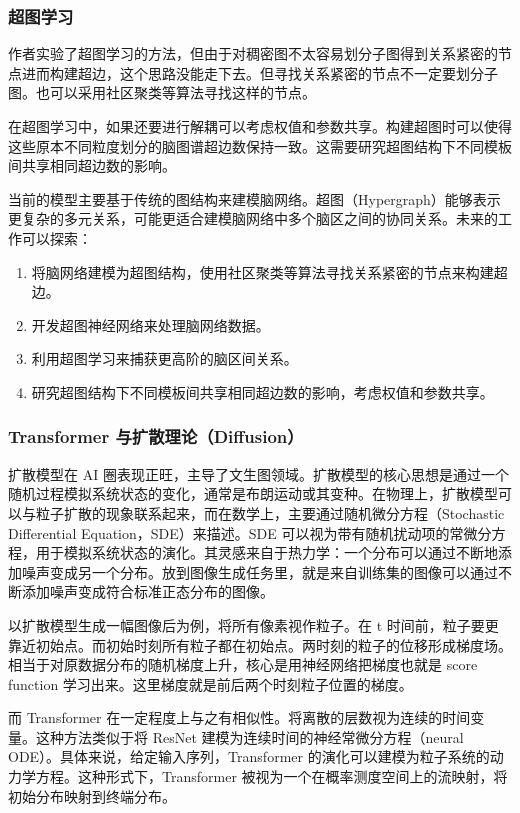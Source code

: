 \documentclass[12pt,a4paper]{article}
\begin{document}
\subsubsection{超图学习}

作者实验了超图学习的方法，但由于对稠密图不太容易划分子图得到关系紧密的节点进而构建超边，这个思路没能走下去。但寻找关系紧密的节点不一定要划分子图。也可以采用社区聚类等算法寻找这样的节点。

在超图学习中，如果还要进行解耦可以考虑权值和参数共享。构建超图时可以使得这些原本不同粒度划分的脑图谱超边数保持一致。这需要研究超图结构下不同模板间共享相同超边数的影响。

当前的模型主要基于传统的图结构来建模脑网络。超图（Hypergraph）能够表示更复杂的多元关系，可能更适合建模脑网络中多个脑区之间的协同关系\cite{feng2019hypergraph}。未来的工作可以探索：

\begin{enumerate}
\item 将脑网络建模为超图结构，使用社区聚类等算法寻找关系紧密的节点来构建超边。
\item 开发超图神经网络来处理脑网络数据。
\item 利用超图学习来捕获更高阶的脑区间关系。
\item 研究超图结构下不同模板间共享相同超边数的影响，考虑权值和参数共享。
\end{enumerate}

\subsubsection{Transformer 与扩散理论（Diffusion）}

扩散模型在 AI 圈表现正旺，主导了文生图领域。扩散模型的核心思想是通过一个随机过程模拟系统状态的变化，通常是布朗运动或其变种。在物理上，扩散模型可以与粒子扩散的现象联系起来，而在数学上，主要通过随机微分方程（Stochastic Differential Equation，SDE）来描述。SDE 可以视为带有随机扰动项的常微分方程，用于模拟系统状态的演化。其灵感来自于热力学：一个分布可以通过不断地添加噪声变成另一个分布。放到图像生成任务里，就是来自训练集的图像可以通过不断添加噪声变成符合标准正态分布的图像。

以扩散模型生成一幅图像后为例，将所有像素视作粒子。在 t 时间前，粒子要更靠近初始点。而初始时刻所有粒子都在初始点。两时刻的粒子的位移形成梯度场。相当于对原数据分布的随机梯度上升，核心是用神经网络把梯度也就是 score function 学习出来。这里梯度就是前后两个时刻粒子位置的梯度。

而 Transformer 在一定程度上与之有相似性。将离散的层数视为连续的时间变量。这种方法类似于将 ResNet 建模为连续时间的神经常微分方程（neural ODE）。具体来说，给定输入序列，Transformer 的演化可以建模为粒子系统的动力学方程。这种形式下，Transformer 被视为一个在概率测度空间上的流映射，将初始分布映射到终端分布\cite{geshkovski2023mathematical}。
\end{document}
